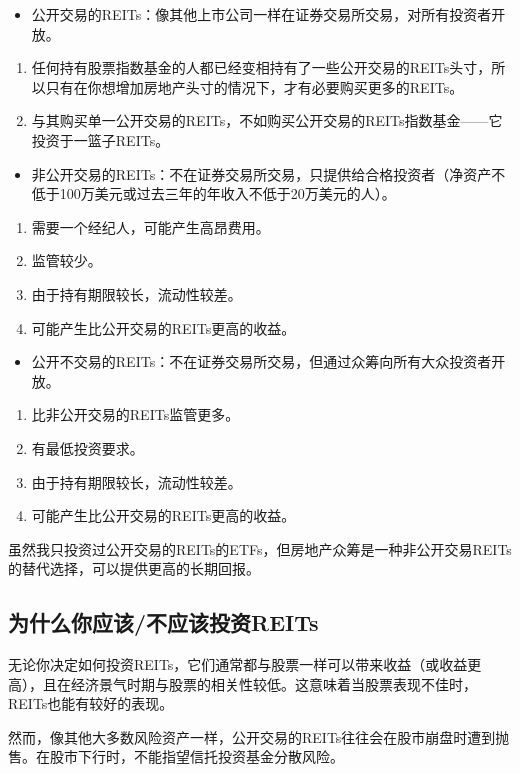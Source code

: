 \begin{itemize}
\item 公开交易的REITs：像其他上市公司一样在证券交易所交易，对所有投资者开放。
\end{itemize}
\begin{enumerate}
\item 任何持有股票指数基金的人都已经变相持有了一些公开交易的REITs头寸，所以只有在你想增加房地产头寸的情况下，才有必要购买更多的REITs。
\item 与其购买单一公开交易的REITs，不如购买公开交易的REITs指数基金——它投资于一篮子REITs。
\end{enumerate}
\begin{itemize}
\item 非公开交易的REITs：不在证券交易所交易，只提供给合格投资者（净资产不低于100万美元或过去三年的年收入不低于20万美元的人）。
\end{itemize}
\begin{enumerate}
\item 需要一个经纪人，可能产生高昂费用。
\item 监管较少。
\item 由于持有期限较长，流动性较差。
\item 可能产生比公开交易的REITs更高的收益。
\end{enumerate}
\begin{itemize}
\item 公开不交易的REITs：不在证券交易所交易，但通过众筹向所有大众投资者开放。
\end{itemize}
\begin{enumerate}
\item 比非公开交易的REITs监管更多。
\item 有最低投资要求。
\item 由于持有期限较长，流动性较差。
\item 可能产生比公开交易的REITs更高的收益。
\end{enumerate}
虽然我只投资过公开交易的REITs的ETFs，但房地产众筹是一种非公开交易REITs的替代选择，可以提供更高的长期回报。

\subsection{为什么你应该/不应该投资REITs}
无论你决定如何投资REITs，它们通常都与股票一样可以带来收益（或收益更高），且在经济景气时期与股票的相关性较低。这意味着当股票表现不佳时，REITs也能有较好的表现。

然而，像其他大多数风险资产一样，公开交易的REITs往往会在股市崩盘时遭到抛售。在股市下行时，不能指望信托投资基金分散风险。

